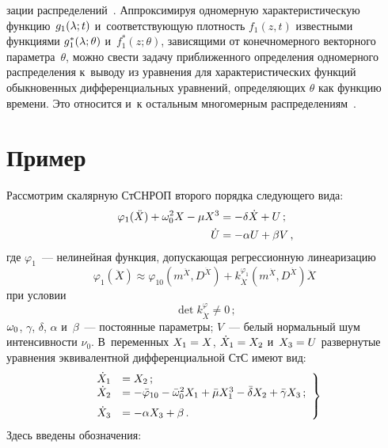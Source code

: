 \begin{multicols}{2}
\noindent
зации распределений~\cite{10-sin}.
Аппроксимируя одномерную характеристическую функцию~$g_1 (\lambda;t)$
и~\mbox{соответствующую} плот\-ность $f_1 (z,t)$ известными функциями
 $g_1^* (\lambda;\theta)$ и~$f_1^* (z;\theta)$,  зависящими от
конечномерного векторного па\-ра\-мет\-ра~$\theta$, можно свести задачу
приближенного определения одномерного распределения к~выводу из
уравнения для характеристических функций обыкновенных
дифференциальных уравнений, определяющих $\theta$ как функцию
времени. Это относится и~к остальным многомерным распределениям~\cite{6-sin}.

\section{Пример }


Рассмотрим скалярную СтСНРОП второго порядка следующего вида:
   \begin{align*}
   \varphi_1 (\ddot X) + \w_0^2 X - \mu X^3 &=-\delta \dot X + U\,;\\ %
\dot U &=-\alpha U + \beta V\,,
\end{align*}
где $\varphi_1$~--- нелинейная функция, допускающая регрессионную линеаризацию
 \begin{equation*}
 \varphi_1 (\ddot X) \approx  \varphi_{10} \left(m^{\ddot X}, D^{\ddot X}\right)+k_{\ddot X}^{\varphi_1}(m^{\ddot X}, D^{\ddot X})\ddot X\
 \end{equation*}
при условии
\begin{equation*}
\det k_{\ddot X}^\varphi \ne 0\,; %
\end{equation*}
$\omega_0$, $\gamma$, $\delta$, $\alpha$ и~$\beta$~--- постоянные па\-ра\-мет\-ры;  $V$~--- белый нормальный шум интенсивности $\nu_0$. 
В~переменных $X_1 \hm=X$, $\dot X_1\hm = X_2$ и~$X_3 \hm=U$ развернутые уравнения эквивалентной дифференциальной СтС имеют вид:
    \begin{equation}
    \left.
    \begin{array}{rl}
    \dot X_1 &= X_2\,;\\
    \dot X_2 &= -\bar\varphi_{10}- \bar{\omega}_0^2 X_1 + \bar\mu X_1^3 - 
    \bar\delta X_2 +\bar\gamma X_3\,; \\[6pt]
     \dot X_3& =-\alpha X_3 +\beta \,.
     \end{array}
     \right\}
    \label{e5.5-s}
    \end{equation}
Здесь введены обозначения:
   \begin{gather*}

\end{gather*}
\end{multicols}
